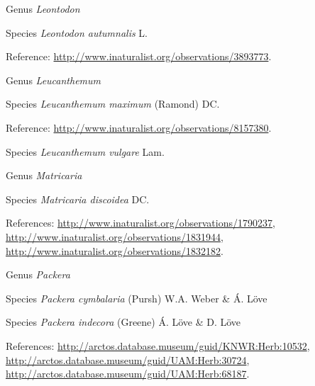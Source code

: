 \documentclass[9pt, article]{memoir}
\begin{document}
\begin{multicols}{2}
\vspace{6pt}\noindent\hspace{30pt}Genus \textit{Leontodon}


\vspace{6pt}\noindent\hspace{36pt}Species \textit{Leontodon autumnalis} L.


\vspace{6pt}Reference: 
\url{http://www.inaturalist.org/observations/3893773}.

\vspace{6pt}\noindent\hspace{30pt}Genus \textit{Leucanthemum}


\vspace{6pt}\noindent\hspace{36pt}Species \textit{Leucanthemum maximum} (Ramond) DC.


\vspace{6pt}Reference: 
\url{http://www.inaturalist.org/observations/8157380}.

\vspace{6pt}\noindent\hspace{36pt}Species \textit{Leucanthemum vulgare} Lam.


\vspace{6pt}\noindent\hspace{30pt}Genus \textit{Matricaria}


\vspace{6pt}\noindent\hspace{36pt}Species \textit{Matricaria discoidea} DC.


\vspace{6pt}References: 
\url{http://www.inaturalist.org/observations/1790237}, 
\url{http://www.inaturalist.org/observations/1831944}, 
\url{http://www.inaturalist.org/observations/1832182}.

\vspace{6pt}\noindent\hspace{30pt}Genus \textit{Packera}


\vspace{6pt}\noindent\hspace{36pt}Species \textit{Packera cymbalaria} (Pursh) W.A. Weber \& Á. Löve


\vspace{6pt}\noindent\hspace{36pt}Species \textit{Packera indecora} (Greene) Á. Löve \& D. Löve


\vspace{6pt}References: 
\url{http://arctos.database.museum/guid/KNWR:Herb:10532}, 
\url{http://arctos.database.museum/guid/UAM:Herb:30724}, 
\url{http://arctos.database.museum/guid/UAM:Herb:68187}.


\end{multicols}
\end{document}
